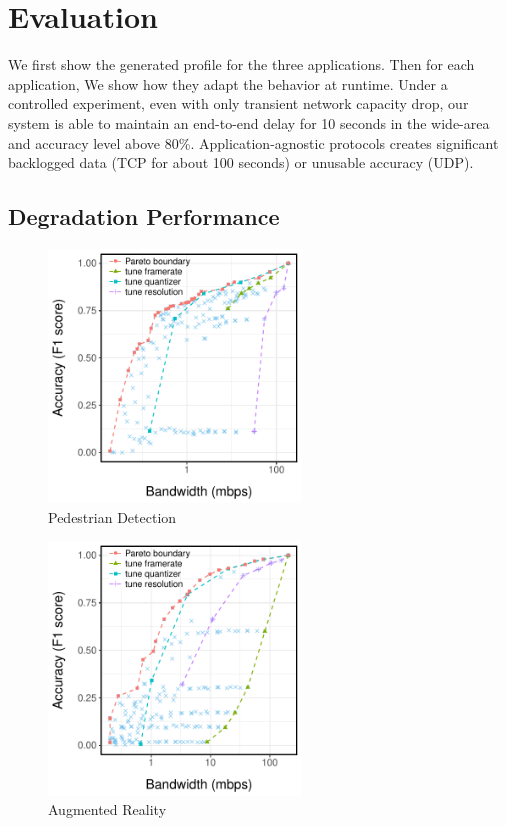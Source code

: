 \section{Evaluation}
\label{sec:evaluation}

We first show the generated profile for the three applications. Then for each
application, We show how they adapt the behavior at runtime. Under a controlled
experiment, even with only transient network capacity drop, our system is able
to maintain an end-to-end delay for 10 seconds in the wide-area and accuracy
level above 80\%. Application-agnostic protocols creates significant backlogged
data (TCP for about 100 seconds) or unusable accuracy (UDP).

\subsection{Degradation Performance}
\label{sec:degr-perf}

\begin{figure}
  \centering
  \includegraphics[width=0.6\textwidth]{figures/ped-profile.pdf}
  \caption{Pedestrian Detection}
  \label{fig:pd-profile}
\end{figure}

\begin{figure}
  \centering
  \includegraphics[width=0.6\textwidth]{figures/darknet-profile.pdf}
  \caption{Augmented Reality}
  \label{fig:ar-profile}
\end{figure}

